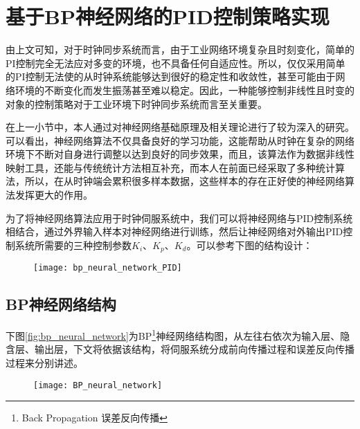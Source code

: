 \section{基于BP神经网络的PID控制策略实现}
由上文可知，对于时钟同步系统而言，由于工业网络环境复杂且时刻变化，简单的PI控制完全无法应对多变的环境，也不具备任何自适应性。所以，仅仅采用简单的PI控制无法使的从时钟系统能够达到很好的稳定性和收敛性，甚至可能由于网络环境的不断变化而发生振荡甚至难以稳定。因此，一种能够控制非线性且时变的对象的控制策略对于工业环境下时钟同步系统而言至关重要。

在上一小节中，本人通过对神经网络基础原理及相关理论进行了较为深入的研究。可以看出，神经网络算法不仅具备良好的学习功能，这能帮助从时钟在复杂的网络环境下不断对自身进行调整以达到良好的同步效果，而且，该算法作为数据非线性映射工具，还能与传统统计方法相互补充，而本人在前面已经采取了多种统计算法，所以，在从时钟端会累积很多样本数据，这些样本的存在正好使的神经网络算法发挥更大的作用\supercite{63}。

为了将神经网络算法应用于时钟伺服系统中，我们可以将神经网络与PID控制系统相结合，通过外界输入样本对神经网络进行训练，然后让神经网络对外输出PID控制系统所需要的三种控制参数$K_{i}$、$K_{p}$、$K_{d}$。可以参考下图的结构设计：

\begin{figure}[!hbp]
  \centering
  \begin{minipage}[b]{0.6\textwidth}
    \captionstyle{\centering}
    \centering
    \texttt{[image: bp\_neural\_network\_PID]}
  \end{minipage}     
\end{figure}

\subsection{BP神经网络结构}
下图\ref{fig:bp_neural_network}为BP\footnote{Back Propagation 误差反向传播}神经网络结构图，从左往右依次为输入层、隐含层、输出层，下文将依据该结构，将伺服系统分成前向传播过程和误差反向传播过程来分别讲述。
\begin{figure}[!hbp]
  \centering
  \begin{minipage}[b]{0.6\textwidth}
    \captionstyle{\centering}
    \centering
    \texttt{[image: BP\_neural\_network]}
  \end{minipage}     
\end{figure}

